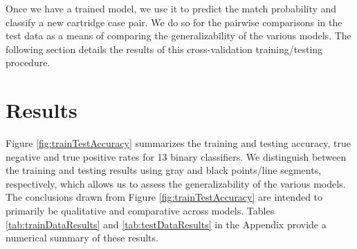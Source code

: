 \documentclass[11pt,]{isuthesis}
\begin{document}
Once we have a trained model, we use it to predict the match probability and classify a new cartridge case pair.
We do so for the pairwise comparisons in the test data as a means of comparing the generalizability of the various models.
The following section details the results of this cross-validation training/testing procedure.

\hypertarget{results}{%
\section{Results}\label{results}}

Figure \ref{fig:trainTestAccuracy} summarizes the training and testing accuracy, true negative and true positive rates for 13 binary classifiers.
We distinguish between the training and testing results using gray and black points/line segments, respectively, which allows us to assess the generalizability of the various models.
The conclusions drawn from Figure \ref{fig:trainTestAccuracy} are intended to primarily be qualitative and comparative across models.
Tables \ref{tab:trainDataResults} and \ref{tab:testDataResults} in the Appendix provide a numerical summary of these results.
\end{document}
